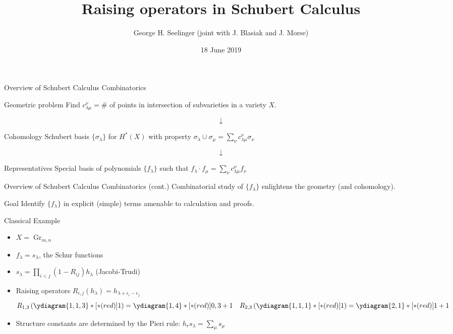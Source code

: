 \documentclass{beamer}
\title[Raising operators in Schubert Calculus]{Raising operators in Schubert Calculus} %
\author[George H. Seelinger]{George H. Seelinger (joint with
  J. Blasiak and J. Morse)} %
\institute[UVA] %
{
GarsiaFest 2019 \\ %
\medskip
\textit{ghs9ae@virginia.edu} %
}
\date{18 June 2019} %
\DeclareMathOperator{\Gr}{Gr}
\newcommand{\cupprod}{\cup}
\begin{document}
\begin{frame}
\titlepage %
\end{frame}
\begin{frame}{Overview of Schubert Calculus Combinatorics}
  \begin{block}{Geometric problem}
    Find \(c_{\lambda \mu}^\nu = \#\) of points in
    intersection of subvarieties in a variety \(X\). \pause
  \end{block}
  \[
    \downarrow
  \]
  \begin{block}{Cohomology}
    Schubert basis \(\{\sigma_\lambda\}\) for \(H^*(X)\) with property \(\sigma_\lambda \cupprod \sigma_\mu = \sum_\nu c_{\lambda \mu}^\nu \sigma_\nu\) \pause 
\end{block}
\[
  \downarrow
\]
\begin{block}{Representatives}
  Special basis of polynomials \(\{f_\lambda\}\) such that \(f_\lambda \cdot f_\mu = \sum_\nu c_{\lambda \mu}^\nu f_\nu\)
\end{block}
\end{frame}
\begin{frame}{Overview of Schubert Calculus Combinatorics (cont.)}
  Combinatorial study of \(\{f_\lambda\}\) enlightens the geometry
  (and cohomology). \pause
  \begin{alertblock}{Goal}
    Identify \(\{f_\lambda\}\) in explicit (simple) terms amenable to
    calculation and proofs.
  \end{alertblock}
\end{frame}
\begin{frame}{Classical Example}
  \begin{example}
    \begin{itemize}
    \item \(X = \Gr_{m,n}\) \pause
    \item \(f_\lambda = s_\lambda\), the Schur functions \pause
    \item \(s_\lambda = \prod_{i < j} (1-R_{ij})h_\lambda\)
      (Jacobi-Trudi) \pause
      \item Raising operators
    \(R_{i,j}(h_\lambda) = h_{\lambda+\epsilon_i-\epsilon_j}\)
    \[
      R_{1,3} \left( \ydiagram{1,1,3}*[*(red)]{1} \right) =
      \ydiagram{1,4}*[*(red)]{0,3+1} \ \ \ R_{2,3} \left(
        \ydiagram{1,1,1}*[*(red)]{1} \right) =
      \ydiagram{2,1}*[*(red)]{1+1}
    \] \pause
    \item Structure constants are determined by the Pieri rule: \(h_r s_\lambda = \sum_{\mu} s_\mu\)
    \end{itemize}
  \end{example}
\end{frame}
\end{document}
